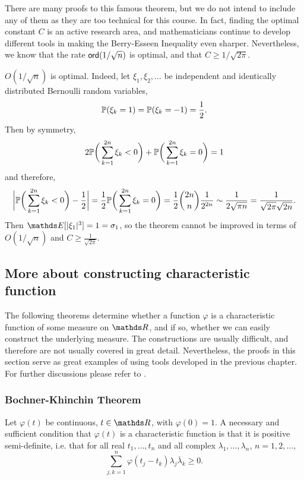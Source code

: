 There are many proofs to this famous theorem, but we do not intend to include any of them as they are too technical for this course. In fact, finding the optimal constant $C$ is an active research area, and mathematicians continue to develop different tools in making the Berry-Esseen Inequality even sharper. Nevertheless, we know that the rate $\mathsf{ord}(1/\sqrt{n})$ is optimal, and that $C \geq 1/\sqrt{2\pi}$.

\begin{remark}
$O(1/\sqrt{n})$ is optimal. Indeed, let $\xi_1, \xi_2, \dots$ be independent and identically distributed Bernoulli random variables, 
\begin{equation*}
    \mathbb{P}(\xi_k = 1) = \mathbb{P}(\xi_k = -1) = \frac12.
\end{equation*}
Then by symmetry,
\begin{equation*}
    2\mathbb{P}\bigg(\sum_{k=1}^{2n} \xi_k < 0\bigg) + \mathbb{P}\bigg(\sum_{k=1}^{2n} \xi_k = 0\bigg) = 1
\end{equation*}
and therefore,
\begin{equation*}
    \bigg|\mathbb{P}\bigg(\sum_{k=1}^{2n} \xi_k < 0\bigg) - \frac12 \bigg| = \frac12 \mathbb{P}\bigg(\sum_{k=1}^{2n} \xi_k = 0\bigg) = \frac12 \binom{2n}{n} \frac{1}{2^{2n}} \sim \frac{1}{2\sqrt{\pi n}} = \frac{1}{\sqrt{2\pi}\sqrt{2n}}.
\end{equation*}
Then $\E[|\xi_1|^3] = 1 = \sigma_1$, so the theorem cannot be improved in terms of $O(1/\sqrt{n})$ and $C \ge \frac{1}{\sqrt{2\pi}}$.
\end{remark}

\subsection{More about constructing characteristic function}
The following theorems determine whether a function $\varphi$ is a characteristic function of some measure on $\R$, and if so, whether we can easily construct the underlying measure. The constructions are usually difficult, and therefore are not usually covered in great detail. Nevertheless, the proofs in this section serve as great examples of using tools developed in the previous chapter. For further discussions please refer to \cite{characteristic_function}.

\subsubsection{Bochner-Khinchin Theorem}
\begin{theorem}
Let $\varphi(t)$ be continuous, $t\in \R$, with $\varphi(0) = 1$. A necessary and sufficient condition that $\varphi(t)$ is a characteristic function is that it is positive semi-definite, i.e. that for all real $t_1, \dots, t_n$ and all complex $\lambda_1, \dots, \lambda_n$, $n=1,2,\dots$,
\begin{equation*}
    \sum_{j,k = 1}^n \varphi(t_j - t_k)\lambda_j \overline{\lambda}_k \ge 0.
\end{equation*}
\end{theorem}

